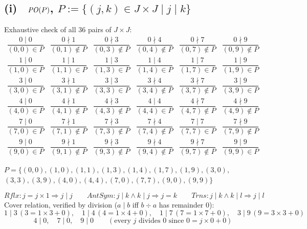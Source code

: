 \documentclass[11pt]{article}
\newcommand{\op}[1]{\mathit{#1}}
\newcommand{\circy}{\fbox{Y}} \newcommand{\circn}{\fbox{N}}
\newcommand{\seclabel}[1]{\noindent\fbox{\textbf{#1}}\par\smallskip}
\begin{document}
\subsection*{(i) \circy\ $\PO(P)$, $P:=\{(j,k)\in J\times J\mid j\mid k\}$}
\seclabel{3a.i}
Exhaustive check of all $36$ pairs of $J\times J$:
\begingroup\tiny\setlength{\arraycolsep}{2pt}
\[
\begin{array}{cccccc}
\dfrac{0\mid0}{(0,0)\in P} & \dfrac{0\nmid1}{(0,1)\notin P} & \dfrac{0\nmid3}{(0,3)\notin P} & \dfrac{0\nmid4}{(0,4)\notin P} & \dfrac{0\nmid7}{(0,7)\notin P} & \dfrac{0\nmid9}{(0,9)\notin P} \\[3mm]
\dfrac{1\mid0}{(1,0)\in P} & \dfrac{1\mid1}{(1,1)\in P} & \dfrac{1\mid3}{(1,3)\in P} & \dfrac{1\mid4}{(1,4)\in P} & \dfrac{1\mid7}{(1,7)\in P} & \dfrac{1\mid9}{(1,9)\in P} \\[3mm]
\dfrac{3\mid0}{(3,0)\in P} & \dfrac{3\nmid1}{(3,1)\notin P} & \dfrac{3\mid3}{(3,3)\in P} & \dfrac{3\nmid4}{(3,4)\notin P} & \dfrac{3\nmid7}{(3,7)\notin P} & \dfrac{3\mid9}{(3,9)\in P} \\[3mm]
\dfrac{4\mid0}{(4,0)\in P} & \dfrac{4\nmid1}{(4,1)\notin P} & \dfrac{4\nmid3}{(4,3)\notin P} & \dfrac{4\mid4}{(4,4)\in P} & \dfrac{4\nmid7}{(4,7)\notin P} & \dfrac{4\nmid9}{(4,9)\notin P} \\[3mm]
\dfrac{7\mid0}{(7,0)\in P} & \dfrac{7\nmid1}{(7,1)\notin P} & \dfrac{7\nmid3}{(7,3)\notin P} & \dfrac{7\nmid4}{(7,4)\notin P} & \dfrac{7\mid7}{(7,7)\in P} & \dfrac{7\nmid9}{(7,9)\notin P} \\[3mm]
\dfrac{9\mid0}{(9,0)\in P} & \dfrac{9\nmid1}{(9,1)\notin P} & \dfrac{9\nmid3}{(9,3)\notin P} & \dfrac{9\nmid4}{(9,4)\notin P} & \dfrac{9\nmid7}{(9,7)\notin P} & \dfrac{9\mid9}{(9,9)\in P}
\end{array}
\]
\endgroup
\begin{center}\small
$P = \{(0,0),(1,0),(1,1),(1,3),(1,4),(1,7),(1,9),(3,0),$\\
$(3,3),(3,9),(4,0),(4,4),(7,0),(7,7),(9,0),(9,9)\}$
\end{center}
\[
\op{Rflx}: j=j\times1\Rightarrow j\mid j\qquad
\op{AntSym}: j\mid k \wedge k\mid j \Rightarrow j=k\qquad
\op{Trns}: j\mid k\wedge k\mid l \Rightarrow j\mid l
\]
Cover relation, verified by division ($a\mid b$ iff $b\div a$ has remainder $0$):
\[
1\mid3\,(3{=}1{\times}3{+}0),\quad1\mid4\,(4{=}1{\times}4{+}0),\quad1\mid7\,(7{=}1{\times}7{+}0),\quad3\mid9\,(9{=}3{\times}3{+}0)
\]
\[
4\mid0,\quad7\mid0,\quad9\mid0\qquad(\text{every }j\text{ divides }0\text{ since }0=j\times0+0)
\]
\begin{center}
\end{center}
\end{document}
